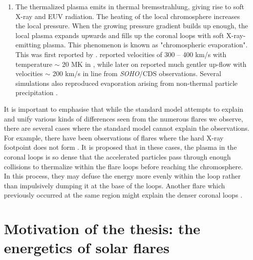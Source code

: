 \begin{enumerate}
    \item  The thermalized plasma emits in thermal bremsstrahlung, giving rise to soft X-ray and EUV radiation. The heating of the local chromosphere increases the local pressure. When the growing pressure gradient builds up enough, the local plasma expands upwards and fills up the coronal loops with soft X-ray-emitting plasma. This phenomenon is known as "chromospheric evaporation". This was first reported by \cite{doscheck80,feldman80}. \cite{antonucci89} reported velocities of 300 {--} 400 km/s with temperature $\sim$ 20 MK in , while later on \cite{milligan06} reported much gentler up-flow with velocities $\sim$ 200 km/s in  line from {\it SOHO}/CDS observations. Several simulations also reproduced evaporation arising from non-thermal particle precipitation \citep{sterling93,hori98,reeves07}.
\end{enumerate}

It is important to emphasise that while the standard model attempts to explain and unify various kinds of differences seen from the numerous flares we observe, there are several cases where the standard model cannot explain the observations. For example, there have been observations of flares where the hard X-ray footpoint does not form \citep{veronig02,veronig04}. It is proposed that in these cases, the plasma in the coronal loops is so dense that the accelerated particles pass through enough collisions to thermalize within the flare loops before reaching the chromosphere. In this process, they may defuse the energy more evenly within the loop rather than impulsively dumping it at the base of the loops. Another flare which previously occurred at the same region might explain the denser coronal loops \citep{strong84,bone07}.  

\section{Motivation of the thesis: the energetics of solar flares}\label{sol_flr_energ}

